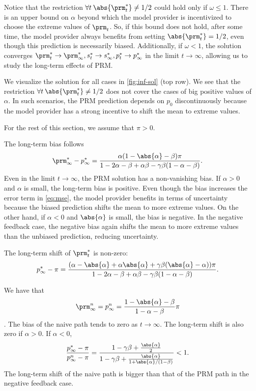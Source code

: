 Notice that the restriction $\forall t \: \abs{\prm^*_t} \neq 1/2$ could hold
only if $\omega \le 1$. There is an upper bound on $\alpha$ beyond which the
model provider is incentivized to choose the extreme values of $\prm_t$. So, if
this bound does not hold, after some time, the model provider always benefits
from setting $\abs{\prm^*_t} = 1/2$, even though this prediction is necessarily
biased. Additionally, if $\omega < 1$, the solution converges $\prm^*_t \to
\prm^*_\infty, s^*_t \to s^*_\infty, p^*_t \to p^*_\infty$ in the limit $t \to
\infty$, allowing us to study the long-term effects of PRM.

We visualize the solution for all cases in \cref{fig:inf-sol} (top row). We
see that the restriction $\forall t \: \abs{\prm^*_t} \neq 1/2$ does not cover
the cases of big positive values of $\alpha$. In such scenarios, the PRM
prediction depends on $p_0$ discontinuously because the model provider has a
strong incentive to shift the mean to extreme values.

For the rest of this section, we assume that $\pi > 0$.

 The long-term bias follows
\[
    \prm^*_\infty - p^*_\infty = \frac{\alpha (1 - \abs{\alpha} - \beta) \pi}{1
    - 2 \alpha - \beta + \alpha \beta - \gamma \beta (1 - \alpha - \beta)}.
\]
Even in the limit $t \to \infty$, the PRM solution has a non-vanishing
bias. If $\alpha > 0$ and $\alpha$ is small, the long-term bias is positive.
Even though the bias increases the error term in \cref{eq:mse}, the model
provider benefits in terms of uncertainty because the biased prediction shifts the
mean to more extreme values. On the other hand, if $\alpha < 0$ and
$\abs{\alpha}$ is small, the bias is negative. In the negative feedback case,
the negative bias again shifts the mean to more extreme values than the
unbiased prediction, reducing uncertainty.

 The long-term shift of $\prm^*_t$ is non-zero:
\[
    p^*_\infty - \pi = \frac{(\alpha - \abs{\alpha} + \alpha \abs{\alpha} +
    \gamma \beta (\abs{\alpha} - \alpha)) \pi}{1 - 2 \alpha - \beta + \alpha
    \beta - \gamma \beta (1 - \alpha - \beta)}.
\]

 We have that $$\prm^n_\infty = p^n_\infty = \frac{1 - \abs{\alpha} - \beta}{1 - \alpha -
    \beta} \pi$$. The bias of the naive path tends to zero as $t \to \infty$. The long-term shift
is also zero if $\alpha > 0$. If $\alpha < 0$,
\[
    \frac{p^*_\infty - \pi}{p^n_\infty - \pi} = \frac{1 - \gamma \beta +
    \frac{\abs{\alpha}}{2}}{1 - \gamma \beta + \frac{\abs{\alpha}}{1 +
    \abs{\alpha} / (1 - \beta)}} < 1.
\]
The long-term shift of the naive path is bigger than that of the PRM path
in the negative feedback case.

